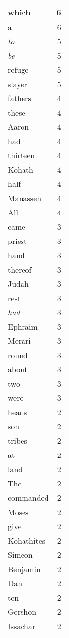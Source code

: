 \begin{center}
\begin{longtable}{l|r}
which & 6\\ \hline 
a & 6\\ \hline 
\emph{to} & 5\\ \hline 
\emph{be} & 5\\ \hline 
refuge & 5\\ \hline 
slayer & 5\\ \hline 
fathers & 4\\ \hline 
these & 4\\ \hline 
Aaron & 4\\ \hline 
had & 4\\ \hline 
thirteen & 4\\ \hline 
Kohath & 4\\ \hline 
half & 4\\ \hline 
Manasseh & 4\\ \hline 
All & 4\\ \hline 
came & 3\\ \hline 
priest & 3\\ \hline 
hand & 3\\ \hline 
thereof & 3\\ \hline 
Judah & 3\\ \hline 
rest & 3\\ \hline 
\emph{had} & 3\\ \hline 
Ephraim & 3\\ \hline 
Merari & 3\\ \hline 
round & 3\\ \hline 
about & 3\\ \hline 
two & 3\\ \hline 
were & 3\\ \hline 
heads & 2\\ \hline 
son & 2\\ \hline 
tribes & 2\\ \hline 
at & 2\\ \hline 
land & 2\\ \hline 
The & 2\\ \hline 
commanded & 2\\ \hline 
Moses & 2\\ \hline 
give & 2\\ \hline 
Kohathites & 2\\ \hline 
Simeon & 2\\ \hline 
Benjamin & 2\\ \hline 
Dan & 2\\ \hline 
ten & 2\\ \hline 
Gershon & 2\\ \hline 
Issachar & 2\\ \hline 

\end{longtable}
\end{center}
